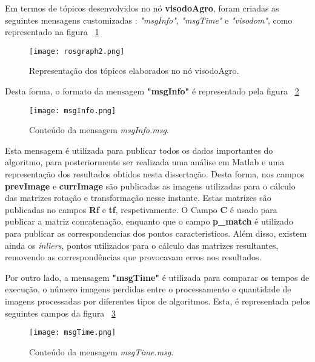 Em termos de tópicos desenvolvidos no nó \textbf{visodoAgro}, foram criadas as seguintes mensagens customizadas : \textit{"msgInfo"}, \textit{"msgTime"} e \textit{"visodom"}, como representado na figura ~\ref{fig:rosgraph}

\begin{figure}[h!] %
	\begin{center}
		\leavevmode		
		\texttt{[image: rosgraph2.png]}
		\caption{Representação dos tópicos elaborados no nó visodoAgro.}
		\label{fig:rosgraph}
	\end{center}
\end{figure}

Desta forma, o formato da mensagem \textbf{"msgInfo"} é representado pela figura  ~\ref{fig:msgInfo}

 \begin{figure}[h!] %
 	\begin{center}
 		\leavevmode		
 		\texttt{[image: msgInfo.png]}
 		\caption{Conteúdo da mensagem \textit{msgInfo.msg}.}
 		\label{fig:msgInfo}
 	\end{center}
 \end{figure}
 



Esta mensagem é utilizada para publicar todos os dados importantes do algoritmo, para posteriormente ser realizada uma análise em Matlab e uma representação dos resultados obtidos nesta dissertação. 
Desta forma, nos campos \textbf{prevImage} e \textbf{currImage} são publicadas as imagens utilizadas para o cálculo das matrizes rotação e transformação nesse instante. Estas matrizes são publicadas no campos \textbf{Rf} e \textbf{tf}, respetivamente. 
O Campo \textbf{C} é usado para publicar a matriz concatenação, enquanto que o campo  \textbf{p\_match} é utilizado para publicar as correspondencias dos pontos caracteristicos. Além disso, existem ainda os \textit{inliers}, pontos utilizados para o cálculo das matrizes resultantes, removendo as correspondências que provocavam erros nos resultados.  


Por outro lado, a mensagem \textbf{"msgTime"} é utilizada para comparar os tempos de execução, o número imagens perdidas entre o processamento e quantidade de imagens processadas por diferentes tipos de algoritmos. Esta, é representada pelos seguintes campos da figura ~\ref{fig:msgTime}

\begin{figure}[h!] %
	\begin{center}
		\leavevmode		
		\texttt{[image: msgTime.png]}
		\caption{Conteúdo da mensagem \textit{msgTime.msg}.}
		\label{fig:msgTime}
	\end{center}
\end{figure}



